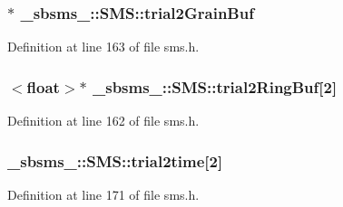 \subsubsection[{\texorpdfstring{trial2\+Grain\+Buf}{trial2GrainBuf}}]{$\ast$ \+\_\+sbsms\+\_\+\+::\+S\+M\+S\+::trial2\+Grain\+Buf\hspace{0.3cm}{\ttfamily [protected]}}\hypertarget{class__sbsms___1_1_s_m_s_a3509d03504eb91a5d87bd460356ece6f}{}\label{class__sbsms___1_1_s_m_s_a3509d03504eb91a5d87bd460356ece6f}


Definition at line 163 of file sms.\+h.

\subsubsection[{\texorpdfstring{trial2\+Ring\+Buf}{trial2RingBuf}}]{$<$float$>$$\ast$ \+\_\+sbsms\+\_\+\+::\+S\+M\+S\+::trial2\+Ring\+Buf\mbox{[}2\mbox{]}\hspace{0.3cm}{\ttfamily [protected]}}\hypertarget{class__sbsms___1_1_s_m_s_a8037e6c4be417e5e3c8e18c6fb142f83}{}\label{class__sbsms___1_1_s_m_s_a8037e6c4be417e5e3c8e18c6fb142f83}


Definition at line 162 of file sms.\+h.

\subsubsection[{\texorpdfstring{trial2time}{trial2time}}]{ \+\_\+sbsms\+\_\+\+::\+S\+M\+S\+::trial2time\mbox{[}2\mbox{]}\hspace{0.3cm}{\ttfamily [protected]}}\hypertarget{class__sbsms___1_1_s_m_s_a372eb830fb9ba81f9fa66b22e8fa76a3}{}\label{class__sbsms___1_1_s_m_s_a372eb830fb9ba81f9fa66b22e8fa76a3}


Definition at line 171 of file sms.\+h.

